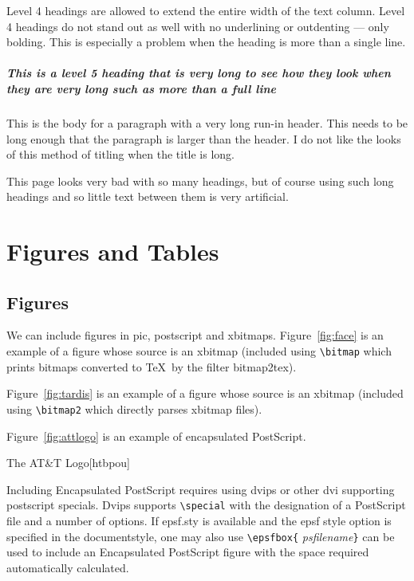 Level 4 headings are allowed to extend the entire width of the text
column.  Level 4 headings do not stand out as well with no underlining
or outdenting --- only bolding.  This is especially a problem when the
heading is more than a single line.


\subparagraph{This is a level 5 heading that is very long to see how
they look when they are very long such as more than a full line} This
is the body for a paragraph with a very long run-in header.  This
needs to be long enough that the paragraph is larger than the header.
I do not like the looks of this method of titling when the title is long.


This page looks very bad with so many headings, but of course using such long 
headings and so little text between them is very artificial.


\section{Figures and Tables}
\subsection{Figures}
We can include figures in pic, postscript and xbitmaps. 
Figure~\ref{fig:face} is an example of a figure whose source is an
xbitmap (included using \verb|\bitmap| which prints bitmaps converted
to \TeX\ by the filter bitmap2tex).


Figure~\ref{fig:tardis} is an example of a figure whose source is an
xbitmap (included using \verb|\bitmap2| which directly parses xbitmap files).

Figure~\ref{fig:attlogo} is an example of encapsulated PostScript.
\begin{capfigure}{\label{fig:attlogo}The AT\&T Logo}[htbpou]
\center{
}
\end{capfigure}
Including Encapsulated PostScript requires using dvips or other dvi
supporting postscript specials.  Dvips supports  \verb|\special| with
the designation of a PostScript file and a number of options.  If
epsf.sty is available and the epsf style option is specified in the
documentstyle, one may also use \verb|\epsfbox{|{\it
psfilename}\verb|}| can be used to include an Encapsulated PostScript
figure with the space required automatically calculated.

